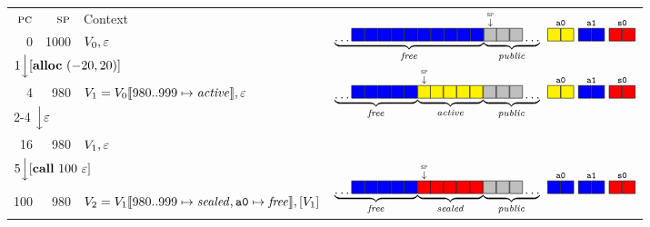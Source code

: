 \documentclass[10pt,conference]{ieeetran}%
\theoremstyle{definition}
\begin{document}
\begin{figure*}
  \begin{tabular}{|r|r||l|r}
    \cline{1-3}
    \(\textsc{pc}\) & \(\textsc{sp}\) & Context &
    \multirow{3}{*}{\(\underbrace{\dots \freebox \freebox \freebox \freebox \freebox
        \freebox \freebox \freebox \freebox \freebox}_\unsealed
      \! \underbrace{\stackrel{\stackrel{\SP}{\downarrow}}{\pubbox} \!\! \pubbox \pubbox \dots}_\public
      ~ \stackrel{\mathtt{a0}}{\objbox\objbox} ~ \stackrel{\mathtt{a1}}{\freebox\freebox}
      ~ \stackrel{\mathtt{s0}}{\sealbox\sealbox}
      \)} \\
    \cline{1-3}
    0 & 1000 & \(V_0, \varepsilon\)
    \\
    \cline{1-3}
    \multicolumn{3}{l}{\multirow{2}{*}{\(1 \Big\downarrow [\mathbf{alloc} ~ (-20,20)]\)}} & \\
    \multicolumn{3}{l}{} &
    \multirow{3}{*}{\(\underbrace{\dots \freebox \freebox \freebox \freebox \freebox}_\unsealed
      \! \underbrace{\stackrel{\stackrel{\SP}{\downarrow}}{\objbox} \!\! \objbox \objbox \objbox \objbox}_\object
      \! \underbrace{\pubbox \pubbox \pubbox \dots}_\public
      ~ \stackrel{\mathtt{a0}}{\objbox\objbox} ~ \stackrel{\mathtt{a1}}{\freebox\freebox}
      ~ \stackrel{\mathtt{s0}}{\sealbox\sealbox}
      \)}
    \\
    \cline{1-3}
    4 & 980 & \(V_1 = V_0 \llbracket 980..999 \mapsto \mathit{active}\rrbracket, \varepsilon\) &
    \\
    \cline{1-3}
    \multicolumn{3}{l}{\multirow{2}{*}{2-4 \(\Big\downarrow \varepsilon\)}} \\ \multicolumn{3}{l}{} \\
    \cline{1-3}
    16 & 980 & \(V_1, \varepsilon\) & \\
    \cline{1-3}
    \multicolumn{3}{l}{\multirow{2}{*}{\(5 \Big\downarrow [\mathbf{call} ~ 100 ~ \varepsilon]\)}} & \\
    \multicolumn{3}{l}{} &
    \multirow{3}{*}{\(\underbrace{\dots \freebox \freebox \freebox \freebox \freebox}_\unsealed
      \! \underbrace{\stackrel{\stackrel{\SP}{\downarrow}}{\sealbox} \!\! \sealbox \sealbox \sealbox \sealbox}_\sealed
      \! \underbrace{\pubbox \pubbox \pubbox \dots}_\public
      ~ \stackrel{\mathtt{a0}}{\freebox\freebox} ~ \stackrel{\mathtt{a1}}{\freebox\freebox}
      ~ \stackrel{\mathtt{s0}}{\sealbox\sealbox}
      \)}
    \\
    \cline{1-3}
    100 & 980 & \(V_2 = V_1 \llbracket 980..999 \mapsto \mathit{sealed}, \mathtt{a0} \mapsto \mathit{free}\rrbracket,[V_1]\) & \\

\end{tabular}
\end{figure*}
\end{document}
